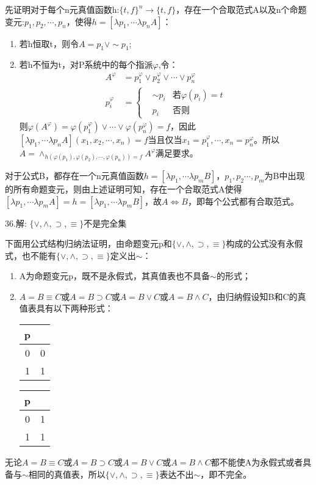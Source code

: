 \documentclass[a4paper]{ctexart}
\begin{document}
先证明对于每个n元真值函数h:$\{t,f\}^n\rightarrow\{t,f\}$，存在一个合取范式A以及n个命题变元:$p_1,p_2,\cdots,p_n$，使得$h=[\lambda p_1,\cdots\lambda p_nA]$：
\begin{enumerate}
  \item 若h恒取t，则令$A=p_1\vee\sim p_1$;
  \item 若h不恒为t，对P系统中的每个指派$\varphi$,令：
  \begin{align*}
    A^\varphi&=p_1^\varphi\vee p_2^\varphi\vee\cdots\vee p_n^\varphi \\
    p_i^\varphi&=\left\{
      \begin{aligned}
        &\sim p_i &\text{若}\varphi(p_i)=t \\
        &p_i &\text{否则}
      \end{aligned}
    \right.
  \end{align*}
  则$\varphi(A^\varphi)=\varphi(p_1^\varphi)\vee\cdots\vee\varphi(p_n^\varphi)=f$，因此$[\lambda p_1,\cdots\lambda p_nA](x_1,x_2,\cdots,x_n)=f$当且仅当$x_1=p_1^\varphi,\cdots,x_n=p_n^\varphi$。所以$A=\wedge_{h(\varphi(p_1),\varphi(p_2),\cdots,\varphi(p_n))=f}A^\varphi$满足要求。
\end{enumerate}
对于公式B，都存在一个n元真值函数$h=[\lambda p_1,\cdots\lambda p_mB]$，$p_1,p_2\cdots,p_m$为B中出现的所有命题变元，则由上述证明可知，存在一个合取范式A使得$[\lambda p_1,\cdots\lambda p_mA]=h=[\lambda p_1,\cdots\lambda p_mB]$，故$A\Leftrightarrow B$，即每个公式都有合取范式。\newline

\noindent 36.解:
$\{\vee,\wedge,\supset,\equiv\}$不是完全集

下面用公式结构归纳法证明，由命题变元p和$\{\vee,\wedge,\supset,\equiv\}$构成的公式没有永假式，也不能有$\{\vee,\wedge,\supset,\equiv\}$定义出$\sim$：
\begin{enumerate}
  \item A为命题变元p，既不是永假式，其真值表也不具备$\sim$的形式；
  \item $A=B\equiv C$或$A=B\supset C$或$A=B\vee C$或$A=B\wedge C$，由归纳假设知B和C的真值表具有以下两种形式：
  \begin{table}[!hbp]
    \begin{tabular}{c|c}
      p &  \\
      \hline
      0 & 0 \\
      1 & 1 \\
    \end{tabular}
    \hfil
    \begin{tabular}{c|c}
      p &  \\
      \hline
      0 & 1  \\
      1 & 1  \\
    \end{tabular}    
  \end{table}
\end{enumerate}
  无论$A=B\equiv C$或$A=B\supset C$或$A=B\vee C$或$A=B\wedge C$都不能使A为永假式或者具备与$\sim$相同的真值表，所以$\{\vee,\wedge,\supset,\equiv\}$表达不出$\sim$，即不完全。\newline
  
\end{document}
